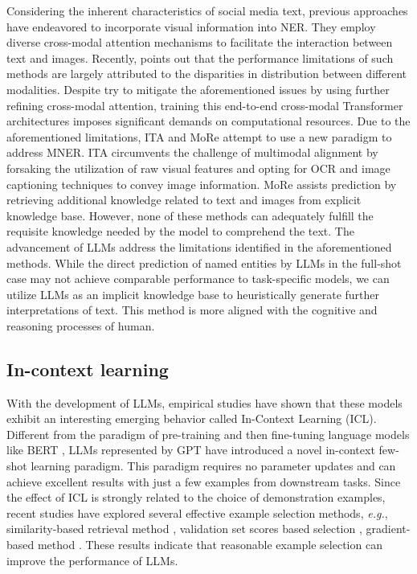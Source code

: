 \documentclass[11pt]{article}
\begin{document}
Considering the inherent characteristics of social media text, previous approaches \citep{moon2018multimodal,zheng2020object,zhang2021multi,zhou2022span,zhao2022learning} have endeavored to incorporate visual information into NER. They employ diverse cross-modal attention mechanisms to facilitate the interaction between text and images. Recently, \citet{wang2021ita} points out that the performance limitations of such methods are largely attributed to the disparities in distribution between different modalities. Despite \citet{wang2022cat} try to mitigate the aforementioned issues by using further refining cross-modal attention, training this end-to-end cross-modal Transformer architectures imposes significant demands on computational resources. Due to the aforementioned limitations, ITA \citep{wang2021ita} and MoRe \citep{wang2022named} attempt to use a new paradigm to address MNER. ITA circumvents the challenge of multimodal alignment by forsaking the utilization of raw visual features and opting for OCR and image captioning techniques to convey image information. MoRe assists prediction by retrieving additional knowledge related to text and images from explicit knowledge base. 
However, none of these methods can adequately fulfill the requisite knowledge needed by the model to comprehend the text. The advancement of LLMs address the limitations identified in the aforementioned methods. While the direct prediction of named entities by LLMs in the full-shot case may not achieve comparable performance to task-specific models, we can utilize LLMs as an implicit knowledge base to heuristically generate further interpretations of text. This method is more aligned with the cognitive and reasoning processes of human. 


\subsection{In-context learning}
With the development of LLMs, empirical studies have shown that these models \citep{brown2020language} exhibit an interesting emerging behavior called In-Context Learning (ICL). Different from the paradigm of pre-training and then fine-tuning language models like BERT \citep{devlin2018bert}, LLMs represented by GPT have introduced a novel in-context few-shot learning paradigm. This paradigm requires no parameter updates and can achieve excellent results with just a few examples from downstream tasks. Since the effect of ICL is strongly related to the choice of demonstration examples, recent studies have explored several effective example selection methods, \emph{e.g.}, similarity-based retrieval method \citep{liu2021makes,rubin2021learning}, validation set scores based selection \citep{lee2021good}, gradient-based method \citep{wang2023large}. These results indicate that reasonable example selection can improve the performance of LLMs.
\end{document}
